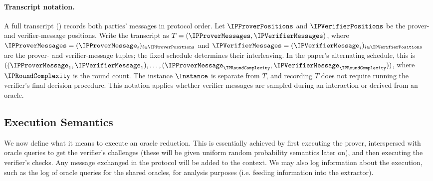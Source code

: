\paragraph{Transcript notation.}
A full transcript () records both parties'
messages in protocol order. Let \(\IPProverPositions\) and \(\IPVerifierPositions\) be the prover- and verifier-message
positions. Write the transcript as \(T=(\IPProverMessages,\IPVerifierMessages)\), where
\(\IPProverMessages=(\IPProverMessage_i)_{i\in \IPProverPositions}\) and \(\IPVerifierMessages=(\IPVerifierMessage_i)_{i\in \IPVerifierPositions}\) are the prover-
and verifier-message tuples; the fixed schedule determines their interleaving.
In the paper's alternating schedule, this is
\(((\IPProverMessage_1,\IPVerifierMessage_1),\ldots,(\IPProverMessage_{\IPRoundComplexity},\IPVerifierMessage_{\IPRoundComplexity}))\), where \(\IPRoundComplexity\) is the round count.
The instance \(\Instance\) is separate from \(T\), and recording \(T\) does not require
running the verifier's final decision procedure. This notation applies whether
verifier messages are sampled during an interaction or derived from an oracle.

\subsection{Execution Semantics}\label{sec:execution_semantics}

We now define what it means to execute an oracle reduction. This is essentially achieved by first
executing the prover, interspersed with oracle queries to get the verifier's challenges (these will
be given uniform random probability semantics later on), and then executing the verifier's checks.
Any message exchanged in the protocol will be added to the context. We may also log information
about the execution, such as the log of oracle queries for the shared oracles, for analysis purposes
(i.e. feeding information into the extractor).

